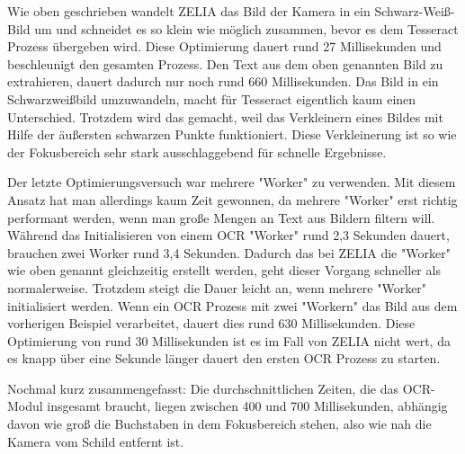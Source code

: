 Wie oben geschrieben wandelt ZELIA das Bild der Kamera in ein Schwarz-Weiß-Bild um und schneidet es so klein wie möglich zusammen, bevor es dem Tesseract Prozess übergeben wird. Diese Optimierung dauert rund 27 Millisekunden und beschleunigt den gesamten Prozess. Den Text aus dem oben genannten Bild zu extrahieren, dauert dadurch nur noch rund 660 Millisekunden. Das Bild in ein Schwarzweißbild umzuwandeln, macht für Tesseract eigentlich kaum einen Unterschied. Trotzdem wird das gemacht, weil das Verkleinern eines Bildes mit Hilfe der äußersten schwarzen Punkte funktioniert. Diese Verkleinerung ist so wie der Fokusbereich sehr stark ausschlaggebend für schnelle Ergebnisse. 

Der letzte Optimierungsversuch war mehrere "Worker" zu verwenden. Mit diesem Ansatz hat man allerdings kaum Zeit gewonnen, da mehrere "Worker" erst richtig performant werden, wenn man große Mengen an Text aus Bildern filtern will. Während das Initialisieren von einem OCR "Worker" rund 2,3 Sekunden dauert, brauchen zwei Worker rund 3,4 Sekunden. Dadurch das bei ZELIA die "Worker" wie oben genannt gleichzeitig erstellt werden, geht dieser Vorgang schneller als normalerweise. Trotzdem steigt die Dauer leicht an, wenn mehrere "Worker" initialisiert werden. Wenn ein OCR Prozess mit zwei "Workern" das Bild aus dem vorherigen Beispiel verarbeitet, dauert dies rund 630 Millisekunden. Diese Optimierung von rund 30 Millisekunden ist es im Fall von ZELIA nicht wert, da es knapp über eine Sekunde länger dauert den ersten OCR Prozess zu starten.

Nochmal kurz zusammengefasst: Die durchschnittlichen Zeiten, die das OCR-Modul insgesamt braucht, liegen zwischen 400 und 700 Millisekunden, abhängig davon wie groß die Buchstaben in dem Fokusbereich stehen, also wie nah die Kamera vom Schild entfernt ist.

